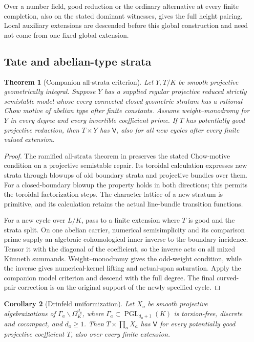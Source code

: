 \documentclass[11pt,a4paper]{article}
\newtheorem{theorem}{Theorem}[section]
\newtheorem{corollary}[theorem]{Corollary}
\theoremstyle{definition}
\theoremstyle{remark}\newtheorem{remark}[theorem]{Remark}
\numberwithin{equation}{section}
\begin{document}
Over a number field, good reduction or the ordinary alternative at
every finite completion, also on the stated dominant witnesses,
gives the full height pairing. Local auxiliary extensions are
descended before this global construction and need not come from
one fixed global extension.

\subsection{Tate and abelian-type strata}

\begin{theorem}[Companion all-strata criterion]\label{thm:abelian-strata}
Let $Y,T/K$ be smooth projective geometrically integral. Suppose
$Y$ has a supplied regular projective reduced strictly
semistable model whose every connected closed geometric stratum
has a rational Chow motive of abelian type after finite constants.
Assume weight--monodromy for $Y$ in every degree and every
invertible coefficient prime. If $T$ has potentially good projective
reduction, then $T\times Y$ has $\mathsf V$, also for all new
cycles after every finite valued extension.
\end{theorem}

\begin{proof}
The ramified all-strata theorem in \cite{InternalUniformization}
preserves the stated Chow-motive condition on a projective
semistable repair. Its toroidal calculation expresses new strata
through blowups of old boundary strata and projective bundles over
them. For a closed-boundary blowup the property holds in both
directions; this permits the toroidal factorization steps. The
character lattice of a new stratum is primitive, and its calculation
retains the actual line-bundle transition functions.

For a new cycle over $L/K$, pass to a finite extension where $T$
is good and the strata split. On one abelian carrier, numerical
semisimplicity and its comparison prime supply an algebraic
cohomological inner inverse to the boundary incidence. Tensor it
with the diagonal of the coefficient, so the inverse acts on all
mixed K\"unneth summands. Weight--monodromy gives the odd-weight
condition, while the inverse gives numerical-kernel lifting and
actual-span saturation. Apply the companion model criterion and
descend with the full degree. The final curved-pair correction is
on the original support of the newly specified cycle.
\end{proof}

\begin{corollary}[Drinfeld uniformization]\label{cor:drinfeld}
Let $X_a$ be smooth projective algebraizations of
$\Gamma_a\backslash\Omega_K^{d_a}$, where
$\Gamma_a\subset\operatorname{PGL}_{d_a+1}(K)$ is torsion-free,
discrete and cocompact, and $d_a\geq1$. Then
$T\times\prod_aX_a$ has $\mathsf V$ for every potentially good
projective coefficient $T$, also over every finite extension.
\end{corollary}
\end{document}
